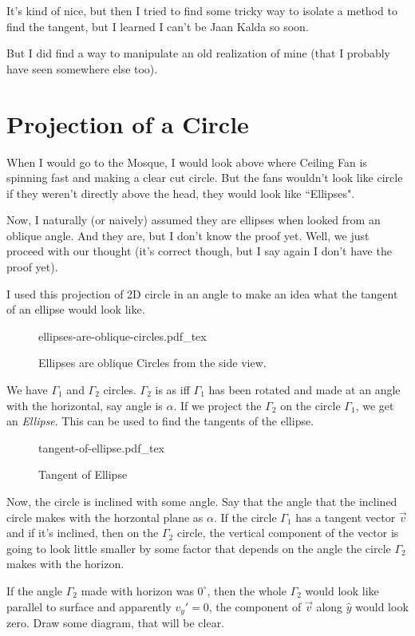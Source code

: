 \documentclass[12pt,a4paper]{article}
\newcommand{\incfig}[1]{%
    \def\svgwidth{0.7\columnwidth}
    {#1.pdf_tex}
}
\begin{document}
It's kind of nice, but then I tried to find some tricky way to isolate a method to find the tangent, but I learned I can't be Jaan Kalda so soon.

But I did find a way to manipulate an old realization of mine (that I probably have seen somewhere else too).


\newpage 
\section{ Projection of a Circle }
When I would go to the Mosque, I would look above where Ceiling Fan is spinning fast and making a clear cut circle. But the fans wouldn't look like circle if they weren't directly above the head, they would look like ``Ellipses".

Now, I naturally (or naively) assumed they are ellipses when looked from an oblique angle. And they are, but I don't know the proof yet. Well, we just proceed with our thought (it's correct though, but I say again I don't have the proof yet). 

I used this projection of 2D circle in an angle to make an idea what the tangent of an ellipse would look like.
\begin{figure}[ht]
    \centering
    \incfig{ellipses-are-oblique-circles}
    \caption{Ellipses are oblique Circles from the side view.}
    \label{fig:ellipses-are-oblique-circles}
\end{figure}
We have $\Gamma_1$ and $\Gamma_2$ circles. $\Gamma_2$ is as iff $\Gamma_1$ has been rotated and made at an angle with the horizontal, say angle is $\alpha$. If we project the $\Gamma_2$ on the circle $\Gamma_1$, we get an \emph{Ellipse}. 
This can be used to find the tangents of the ellipse.

\begin{figure}[ht]
    \centering
    \incfig{tangent-of-ellipse}
    \caption{Tangent of Ellipse}
    \label{fig:tangent-of-ellipse}
\end{figure}

Now, the circle is inclined with some angle. Say that the angle that the inclined circle makes with the horzontal plane as $\alpha$. If the circle $\Gamma_1$ has a tangent vector $\vec{v}$ and if it's inclined, then on the $\Gamma_2$ circle, the vertical component of the vector is going to look little smaller by some factor that depends on the angle the circle $\Gamma_{2}$ makes with the horizon. 

If the angle $\Gamma_2$ made with horizon was $0^{\circ}$, then the whole $\Gamma_2$ would look like parallel to surface and apparently $v_y' = 0$, the component of $\vec{v}$ along $\hat{y}$ would look zero. Draw some diagram, that will be clear.
\end{document}
